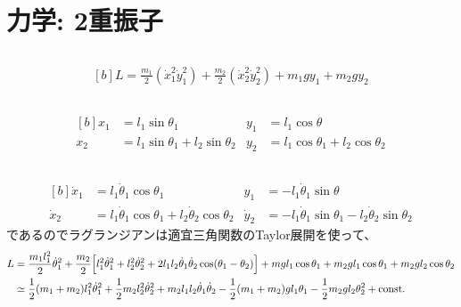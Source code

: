 \documentclass[../../sp_2016.tex]{subfiles}
\begin{document}
\section{力学: 2重振子}
\subsection{}
\begin{equation}\begin{aligned}[b]
    L = \frac{m_1}{2}(\dot{x}_1^2\dot{y}_1^2)+\frac{m_2}{2}(\dot{x}_2^2\dot{y}_2^2)+m_1gy_1+m_2gy_2
\end{aligned}\end{equation}
\subsection{}
\begin{equation}\begin{aligned}[b]
    x_1 &= l_1\sin\theta_1 & y_1 &= l_1\cos\theta\\
    x_2 &= l_1\sin\theta_1+l_2\sin\theta_2 &  y_2&= l_1\cos\theta_1+l_2\cos\theta_2
\end{aligned}\end{equation}

\subsection{}
\begin{equation}\begin{aligned}[b]
    \dot{x}_1 &= l_1\dot{\theta}_1\cos\theta_1 & y_1 &= -l_1\dot{\theta}_1\sin\theta\\
    \dot{x}_2&= l_1\dot{\theta}_1\cos\theta_1+l_2\dot{\theta}_2\cos\theta_2 &
    \dot{y}_2&= -l_1\dot{\theta}_1\sin\theta_1-l_2\dot{\theta}_2\sin\theta_2
\end{aligned}\end{equation}
であるのでラグランジアンは適宜三角関数のTaylor展開を使って、
\begin{equation}\begin{aligned}[b]
    L &= \frac{m_1l_1^2}{2}\dot{\theta}_1^2+\frac{m_2}{2}\Bigl[
        l_1^2\dot{\theta}_1^2+l_2^2\dot{\theta}_2^2+2l_1l_2\dot{\theta}_1\dot{\theta}_2\cos(\theta_1-\theta_2)
    \Bigr]+mgl_1\cos\theta_1+m_2gl_1\cos\theta_1+m_2gl_2\cos\theta_2\\
    &\simeq
    \frac{1}{2}(m_1+m_2)l_1^2\dot{\theta}_1^2+\frac{1}{2}m_2l_2^2\dot{\theta}_2^2+m_2l_1l_2\dot{\theta}_1\dot{\theta}_2
    -\frac{1}{2}(m_1+m_2)gl_1\theta_1-\frac{1}{2}m_2gl_2\theta_2^2+\text{const.}
\end{aligned}\end{equation}
\end{document}
